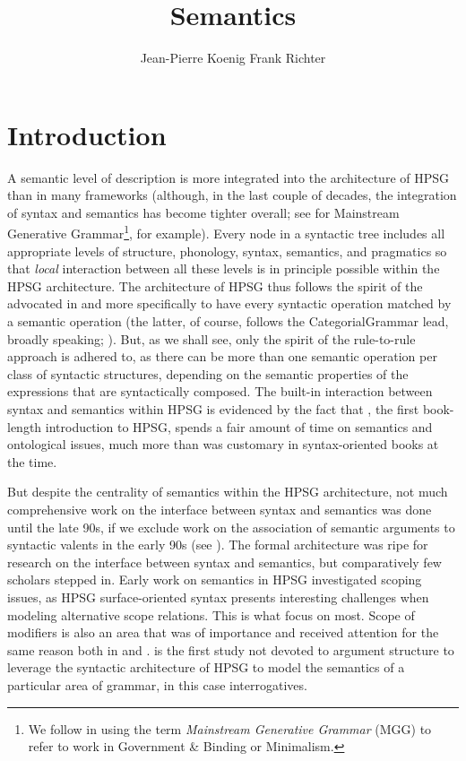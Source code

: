 \documentclass[output=paper
 	        ,biblatex
                ,babelshorthands
                ,newtxmath
                ,draftmode
                ,colorlinks, citecolor=brown
]{langscibook}
\author{%
	Jean-Pierre Koenig\affiliation{University at Buffalo}%
	\lastand Frank Richter\affiliation{Goethe Universität Frankfurt}%
}
\title{Semantics}
\begin{document}
\maketitle
\label{chap-semantics}

\section{Introduction} 

A semantic level of description is more integrated into the architecture of HPSG
than in many frameworks (although, in the last couple of decades, the integration of syntax and
semantics has become tighter overall; see \citealt{HeimandKratzer1998} for Mainstream Generative
Grammar\footnote{ We follow \citet[]{CJ2005a} in using the term \emph{Mainstream Generative
    Grammar} (MGG) to refer to work in Government \& Binding or Minimalism.}, for example). Every
node in a syntactic tree includes all appropriate levels of structure, phonology, syntax, semantics,
and pragmatics so that \emph{local} interaction between all these levels is in principle possible
within the HPSG architecture. The architecture of HPSG thus follows the spirit of the
 advocated in \citet{Bach1976} and more specifically
\citet{KleinandSag1985} to have every syntactic operation matched by a semantic operation (the
latter, of course, follows the Categorial\indexcg Grammar lead, broadly speaking;
\citealt{Ajdukiewicz35a-u,Pollard84a-u,Steedman2000a-u}). But, as we shall see, only the spirit of
the rule-to-rule approach is adhered to, as there can be more than one semantic operation per class
of syntactic structures, depending on the semantic properties of the expressions that are
syntactically composed. The built-in interaction between syntax and semantics within HPSG is
evidenced by the fact that \citet{PollardandSag1987}, the first book-length introduction to HPSG,
spends a fair amount of time on semantics and ontological issues, much more than was customary in
syntax-oriented books at the time.

But despite the centrality of semantics within the HPSG architecture, not much comprehensive work on
the interface between syntax and semantics was done until the late 90s, if we exclude work on the
association of semantic arguments to syntactic valents in the early 90s (see
). The formal architecture was ripe for research on the interface between
syntax and semantics, but comparatively few scholars stepped in.  Early work on semantics in HPSG
investigated scoping issues, as HPSG surface-oriented syntax presents interesting challenges when
modeling alternative scope relations. This is what \citet{PollardandSag1987, PollardandSag1994}
focus on most. Scope of modifiers is also an area that was of importance and received attention for
the same reason both in \citet{PollardandSag1994} and \citet{Kasper1997}. 
is the first study not devoted to argument structure to leverage the syntactic architecture of HPSG
to model the semantics of a particular area of grammar, in this case interrogatives.
\end{document}
